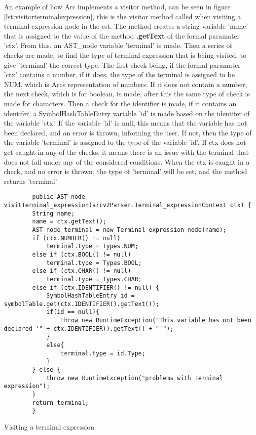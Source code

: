 An example of how Arc implements a visitor method, can be seen in figure \ref{lst:visitorterminalexpression}, this is the visitor method called when visiting a terminal expression node in the \gls{cst}. The method creates a string variable 'name' that is assigned to the value of the method \textbf{.getText} of the formal paramater 'ctx'. From this, an AST\_node variable 'terminal' is made. Then a series of checks are made, to find the type of terminal expression that is being visited, to give 'terminal' the correct type. The first check being, if the formal paramater 'ctx' contains a number, if it does, the type of the terminal is assigned to be NUM, which is Arcs representation of numbers. If it does not contain a number, the next check, which is for boolean, is made, after this the same type of check is made for characters. Then a check for the identifier is made, if it contains an identifer, a SymbolHashTableEntry variable 'id' is made based on the identifer of the variable 'ctx'. If the variable 'id' is null, this means that the variable has not been declared, and an error is thrown, informing the user. If not, then the type of the variable 'terminal' is assigned to the type of the variable 'id'. If ctx does not get caught in any of the checks, it means there is an issue with the terminal that does not fall under any of the considered conditions. When the ctx is caught in a check, and no error is thrown, the type of 'terminal' will be set, and the method returns 'terminal'


\begin{listing}[htb!]
    \begin{verbatim}
        public AST_node visitTerminal_expression(arcv2Parser.Terminal_expressionContext ctx) {
        String name;
        name = ctx.getText();
        AST_node terminal = new Terminal_expression_node(name);
        if (ctx.NUMBER() != null)
            terminal.type = Types.NUM;
        else if (ctx.BOOL() != null)
            terminal.type = Types.BOOL;
        else if (ctx.CHAR() != null)
            terminal.type = Types.CHAR;
        else if (ctx.IDENTIFIER() != null) {
            SymbolHashTableEntry id = symbolTable.get(ctx.IDENTIFIER().getText());
            if(id == null){
                throw new RuntimeException("This variable has not been declared '" + ctx.IDENTIFIER().getText() + "'");
            }
            else{
                terminal.type = id.Type;
            }
        } else {
            throw new RuntimeException("problems with terminal expression");
        }
        return terminal;
        }
    \end{verbatim}
    \caption{Visiting a terminal expression}
    \label{lst:visitorterminalexpression}
\end{listing}


